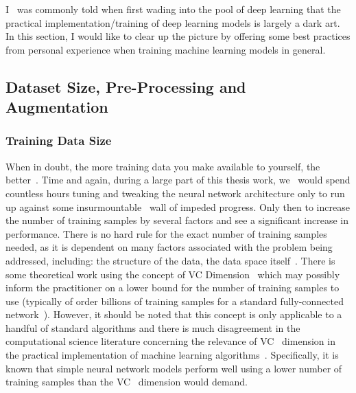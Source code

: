 I~ was commonly told when first wading into the pool of deep learning that the practical implementation/training of deep learning models is largely a dark art. In this section, I would like to clear up the picture by offering some best practices from personal experience when training machine learning models in general.

\subsection{Dataset Size, Pre-Processing and Augmentation}

%
%
\subsubsection{Training Data Size}
%
When in doubt, the more training data you make available to yourself, 
the better~\cite{2019arXiv190110496L,2021arXiv210209382K}. Time and again, during a large part of this thesis work, we~ would spend countless hours tuning and tweaking the neural network architecture only to run up against some insurmountable~ wall of impeded progress. Only then to increase the number of training samples by several factors and see a significant increase in performance. There is no hard rule for the exact number of training samples 
needed, as it is dependent on many factors associated with the problem being addressed, including: the structure of the data, the data space itself~. There is some theoretical work using the concept of \ac{VC} Dimension~\cite{inbook} which may possibly inform the practitioner on a lower bound for the number of training samples to use (typically of order billions of training samples for a standard fully-connected network~\cite{inbook}). However, it should be noted that this concept is only applicable to a handful of standard algorithms and there is much disagreement in the computational science literature concerning the relevance of VC~ dimension in the practical implementation of machine learning 
algorithms~\cite{2017JSP...168.1223L,2016arXiv161103530Z,2018arXiv180303635F}. Specifically, it is known that simple neural network models perform well using a lower number of training samples than the VC~ dimension would demand.~


